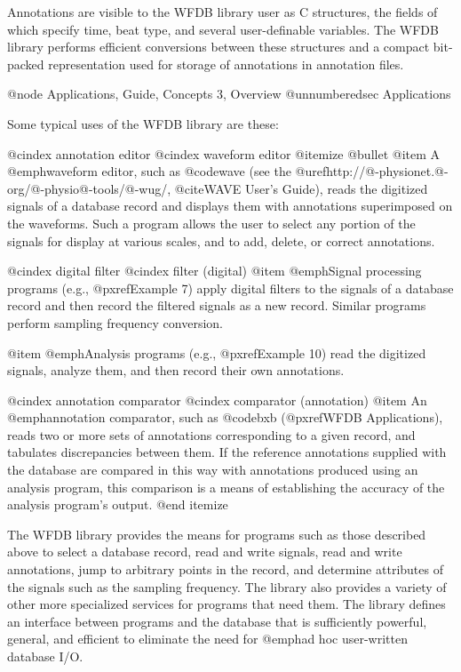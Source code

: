Annotations are visible to the WFDB library user as C structures, the
fields of which specify time, beat type, and several user-definable
variables.  The WFDB library performs efficient conversions between these
structures and a compact bit-packed representation used for storage of
annotations in annotation files.

@node     Applications, Guide, Concepts 3, Overview
@unnumberedsec Applications

Some typical uses of the WFDB library are these:

@cindex annotation editor
@cindex waveform editor
@itemize @bullet
@item
A @emph{waveform editor}, such as @code{wave} (see the
@uref{http://@-physionet.@-org/@-physio@-tools/@-wug/,
@cite{WAVE User's Guide}}), reads the
digitized signals of a database record and displays them with
annotations superimposed on the waveforms.  Such a program allows the
user to select any portion of the signals for display at various scales,
and to add, delete, or correct annotations.

@cindex digital filter
@cindex filter (digital)
@item
@emph{Signal processing programs} (e.g., @pxref{Example 7}) apply digital
filters to the signals of a database record and then record the filtered
signals as a new record.  Similar programs perform sampling frequency
conversion.

@item
@emph{Analysis programs} (e.g., @pxref{Example 10}) read the digitized
signals, analyze them, and then record their own annotations.

@cindex annotation comparator
@cindex comparator (annotation)
@item
An @emph{annotation comparator}, such as @code{bxb}
(@pxref{WFDB Applications}), reads two or more sets of annotations
corresponding to a given record, and tabulates discrepancies between
them.  If the reference annotations supplied with the database are
compared in this way with annotations produced using an analysis
program, this comparison is a means of establishing the accuracy of the
analysis program's output.
@end itemize

The WFDB library provides the means for programs such as those described
above to select a database record, read and write signals, read and
write annotations, jump to arbitrary points in the record, and determine
attributes of the signals such as the sampling frequency.  The library
also provides a variety of other more specialized services for programs
that need them.  The library defines an interface between programs and
the database that is sufficiently powerful, general, and efficient to
eliminate the need for @emph{ad hoc} user-written database I/O.

